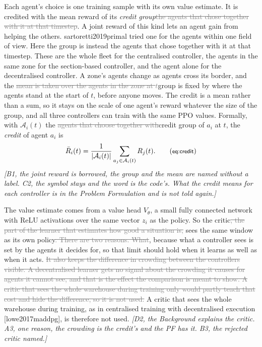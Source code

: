 \documentclass[11pt,a4paper]{article}
\newcommand{\new}[1]{\textcolor{newc}{#1}}
\newcommand{\old}[1]{\textcolor{gray}{\sout{#1}}}
\newcommand{\note}[1]{{\small\itshape [#1]}}
\newcommand{\lab}[1]{\textsf{\footnotesize #1}}
\newcommand{\citep}[1]{[\lab{#1}]}
\newcommand{\citet}[1]{\lab{#1}}
\begin{document}
Each agent's choice is one training sample with its own value estimate. It
is credited with the mean reward of \new{its \emph{credit group}}\old{the
agents that chose together with it at that timestep}. \new{A joint reward of
this kind lets an agent gain from helping the others.
\citet{sartoretti2019primal} tried one for the agents within one field of
view. Here the group is instead the agents that chose together with it at
that timestep.} These are the whole fleet for the centralised controller, the
agents in the same zone for the section-based controller, and the agent alone
for the decentralised controller. A zone's agents change as agents cross its
border, and the \old{mean is taken over the agents in the zone at
$t$}\new{group is fixed by where the agents stand at the start of $t$, before
anyone moves}. \new{The credit is a mean rather than a sum, so it stays on the
scale of one agent's reward whatever the size of the group, and all three
controllers can train with the same PPO values.} Formally, with
$\mathcal{A}_i(t)$ the \old{agents that choose together with}\new{credit group
of} $a_i$ at $t$, the \emph{credit} of agent $a_i$ is
\begin{equation*}
  \bar R_i(t) = \frac{1}{|\mathcal{A}_i(t)|} \sum_{a_j \in \mathcal{A}_i(t)} R_j(t) .
  \tag{\lab{eq:credit}}
\end{equation*}
\note{B1, the joint reward is borrowed, the group and the mean are named
without a label. C2, the symbol stays and the word is the code's. What the
credit means for each controller is in the Problem Formulation and is not
told again.}

The value estimate comes from a value head $V_\theta$, a small fully
connected network with ReLU activations over the same vector $z_i$ as the
policy. So the critic\old{, the part of the learner that estimates how good a
situation is,} sees the same window as its own policy\old{. There are two
reasons. What}\new{, because what} a controller sees is set by the agents it
decides for, so that limit should hold when it learns as well as when it
acts. \old{It also keeps the difference in crowding between the controllers
visible. A decentralised learner gets no signal about the crowding it causes
for agents it cannot see, and that is the effect the comparison is meant to
show. A critic that sees the whole warehouse during training only would
partly teach that cost and hide the difference, so it is not used.} \new{A
critic that sees the whole warehouse during training, as in centralised
training with decentralised execution \citep{lowe2017maddpg}, is therefore
not used.} \note{D2, the Background explains the critic. A3, one reason, the
crowding is the credit's and the PF has it. B3, the rejected critic named.}
\end{document}
